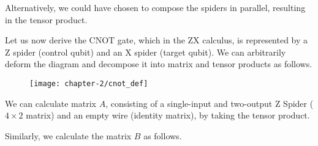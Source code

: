 Alternatively, we could have chosen to compose the spiders in parallel, resulting in the tensor product.
\begin{figure}[H]
    \centering
\end{figure}

Let us now derive the CNOT gate, which in the ZX calculus, is represented by a Z spider (control qubit) and an X spider (target qubit). We can arbitrarily deform the diagram and decompose it into matrix and tensor products as follows.
\begin{figure}[H]
    \centering
    \texttt{[image: chapter-2/cnot\_def]}
\end{figure}

We can calculate matrix $A$, consisting of a single-input and two-output Z Spider ($4 \times 2$ matrix) and an empty wire (identity matrix), by taking the tensor product.
\begin{figure}[H]
    \centering
\end{figure}

Similarly, we calculate the matrix $B$ as follows.
\begin{figure}[H]
    \centering
\end{figure}

